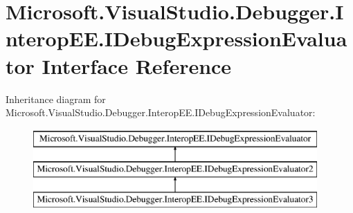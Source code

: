 \hypertarget{interface_microsoft_1_1_visual_studio_1_1_debugger_1_1_interop_e_e_1_1_i_debug_expression_evaluator}{\section{Microsoft.\+Visual\+Studio.\+Debugger.\+Interop\+E\+E.\+I\+Debug\+Expression\+Evaluator Interface Reference}
\label{interface_microsoft_1_1_visual_studio_1_1_debugger_1_1_interop_e_e_1_1_i_debug_expression_evaluator}
}
Inheritance diagram for Microsoft.\+Visual\+Studio.\+Debugger.\+Interop\+E\+E.\+I\+Debug\+Expression\+Evaluator\+:\begin{figure}[H]
\begin{center}
\leavevmode
\includegraphics[height=3.000000cm]{interface_microsoft_1_1_visual_studio_1_1_debugger_1_1_interop_e_e_1_1_i_debug_expression_evaluator}
\end{center}
\end{figure}
